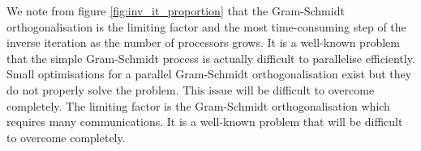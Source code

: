  We note from figure \ref{fig:inv_it_proportion} that the Gram-Schmidt orthogonalisation is the limiting factor and the most time-consuming step of the inverse iteration as the number of processors grows.
 It is a well-known problem that the simple Gram-Schmidt process is actually difficult to parallelise efficiently.
 Small optimisations for a parallel Gram-Schmidt orthogonalisation exist \cite{katagiri_parallel_gram_schmidt_2003} but they do not properly solve the problem.
 This issue will be difficult to overcome completely.
\else
 The limiting factor is the Gram-Schmidt orthogonalisation which requires many communications.
 It is a well-known problem that will be difficult to overcome completely.
\fi
